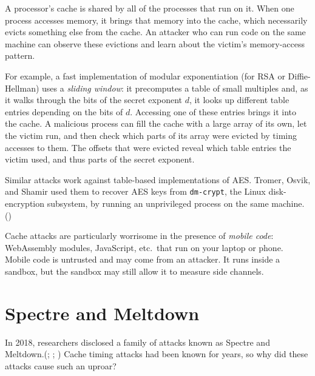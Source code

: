 \documentclass[
  letterpaper,
]{scrbook}
\theoremstyle{definition}
\theoremstyle{plain}
\theoremstyle{plain}
\theoremstyle{remark}
\begin{document}
A processor's cache is shared by all of the processes that run on it.
When one process accesses memory, it brings that memory into the cache,
which necessarily evicts something else from the cache. An attacker who
can run code on the same machine can observe these evictions and learn
about the victim's memory-access pattern.

For example, a fast implementation of modular exponentiation (for RSA or
Diffie-Hellman) uses a \emph{sliding window}: it precomputes a table of
small multiples and, as it walks through the bits of the secret exponent
\(d\), it looks up different table entries depending on the bits of
\(d\). Accessing one of these entries brings it into the cache. A
malicious process can fill the cache with a large array of its own, let
the victim run, and then check which parts of its array were evicted by
timing accesses to them. The offsets that were evicted reveal which
table entries the victim used, and thus parts of the secret exponent.

Similar attacks work against table-based implementations of AES. Tromer,
Osvik, and Shamir used them to recover AES keys from \texttt{dm-crypt},
the Linux disk-encryption subsystem, by running an unprivileged process
on the same machine.()

Cache attacks are particularly worrisome in the presence of \emph{mobile
code}: WebAssembly modules, JavaScript, etc.~that run on your laptop or
phone. Mobile code is untrusted and may come from an attacker. It runs
inside a sandbox, but the sandbox may still allow it to measure side
channels.

\chapter{Spectre and Meltdown}\label{sec-sc-spectre}

In 2018, researchers disclosed a family of attacks known as Spectre and
Meltdown.(;
;
) Cache timing
attacks had been known for years, so why did these attacks cause such an
uproar?
\end{document}
